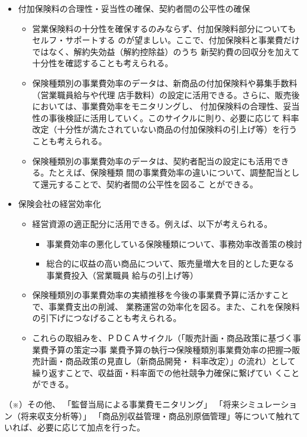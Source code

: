 \documentclass[report,gutter=10mm,fore-edge=10mm,uplatex,dvipdfmx]{jlreq}
\begin{document}
\begin{itemize}
 \item[] 付加保険料の合理性・妥当性の確保、契約者間の公平性の確保
\begin{itemize}
\item[] 営業保険料の十分性を確保するのみならず、付加保険料部分についてもセルフ・サポートする
 のが望ましい。ここで、付加保険料と事業費だけではなく、解約失効益（解約控除益）のうち
 新契約費の回収分を加えて十分性を確認することも考えられる。
\item[] 保険種類別の事業費効率のデータは、新商品の付加保険料や募集手数料（営業職員給与や代理
 店手数料）の設定に活用できる。さらに、販売後においては、事業費効率をモニタリングし、
 付加保険料の合理性、妥当性の事後検証に活用していく。このサイクルに則り、必要に応じて
 料率改定（十分性が満たされていない商品の付加保険料の引上げ等）を行うことも考えられる。
\item[] 保険種類別の事業費効率のデータは、契約者配当の設定にも活用できる。たとえば、保険種類
 間の事業費効率の違いについて、調整配当として還元することで、契約者間の公平性を図るこ
 とができる。
\end{itemize}
\item[] 保険会社の経営効率化
\begin{itemize}
\item[] 経営資源の適正配分に活用できる。例えば、以下が考えられる。
\begin{itemize}
 \item[] 事業費効率の悪化している保険種類について、事務効率改善策の検討
 \item[] 総合的に収益の高い商品について、販売量増大を目的とした更なる事業費投入（営業職員
 給与の引上げ等）
\end{itemize} 
\item[] 保険種類別の事業費効率の実績推移を今後の事業費予算に活かすことで、事業費支出の削減、
 業務運営の効率化を図る。また、これを保険料の引下げにつなげることも考えられる。
 \item[] これらの取組みを、ＰＤＣＡサイクル（「販売計画・商品政策に基づく事業費予算の策定⇒事
 業費予算の執行⇒保険種類別事業費効率の把握⇒販売計画・商品政策の見直し（新商品開発・
 料率改定）」の流れ）として繰り返すことで、収益面・料率面での他社競争力確保に繋げてい
 くことができる。
\end{itemize}
\end{itemize}
（※）その他、
「監督当局による事業費モニタリング」
「将来シミュレーション（将来収支分析等）」
「商品別収益管理・商品別原価管理」等について触れていれば、必要に応じて加点を行った。
\end{document}
